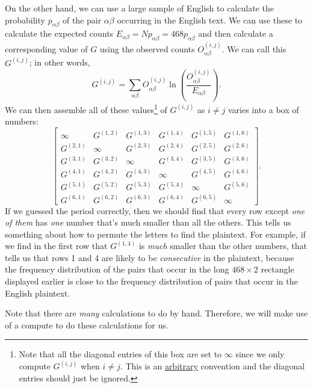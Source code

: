 \documentclass[letterpaper]{article}
\begin{document}
\begin{enumerate}
    \bigskip 

    On the other hand, we can use a large sample of English to calculate the probability $p_{\alpha\beta}$ of the pair $\alpha\beta$ occurring in the English text. We can use these to calculate the expected counts $E_{\alpha\beta} = Np_{\alpha\beta} = 468p_{\alpha\beta}$ and then calculate a corresponding value of $G$ using the observed counts $O_{\alpha\beta}^{(i, j)}$. We can call this $G^{(i, j)}$; in other words, 
    \[G^{(i, j)} = \sum_{\alpha\beta} O_{\alpha\beta}^{(i, j)} \ln\left(\frac{O_{\alpha\beta}^{(i, j)}}{E_{\alpha\beta}}\right).\]
    We can then assemble all of these values\footnote{Note that all the diagonal entries of this box are set to $\infty$ since we only compute $G^{(i, j)}$ when $i \neq j$. This is an \underline{arbitrary} convention and the diagonal entries should just be ignored.} of $G^{(i, j)}$ as $i \neq j$ varies into a box of numbers: 
    \[\begin{bmatrix}
        \infty     & G^{(1, 2)} & G^{(1, 3)} & G^{(1, 4)} & G^{(1, 5)} & G^{(1, 6)} \\ 
        G^{(2, 1)} & \infty     & G^{(2, 3)} & G^{(2, 4)} & G^{(2, 5)} & G^{(2, 6)} \\ 
        G^{(3, 1)} & G^{(3, 2)} & \infty     & G^{(3, 4)} & G^{(3, 5)} & G^{(3, 6)} \\ 
        G^{(4, 1)} & G^{(4, 2)} & G^{(4, 3)} & \infty     & G^{(4, 5)} & G^{(4, 6)} \\ 
        G^{(5, 1)} & G^{(5, 2)} & G^{(5, 3)} & G^{(5, 4)} & \infty     & G^{(5, 6)} \\ 
        G^{(6, 1)} & G^{(6, 2)} & G^{(6, 3)} & G^{(6, 4)} & G^{(6, 5)} & \infty
    \end{bmatrix}.\]
    If we guessed the period correctly, then we should find that every row except \emph{one of them} has \emph{one} number that's much smaller than all the others. This tells us something about how to permute the letters to find the plaintext. For example, if we find in the first row that $G^{(1, 4)}$ is \emph{much} smaller than the other numbers, that tells us that rows 1 and 4 are likely to be \emph{consecutive} in the plaintext, because the frequency distribution of the pairs that occur in the long $468 \times 2$ rectangle displayed earlier is close to the frequency distribution of pairs that occur in the English plaintext.

    \bigskip 

    Note that there are \emph{many} calculations to do by hand. Therefore, we will make use of a compute to do these calculations for us. 
\end{enumerate}
\end{document}
